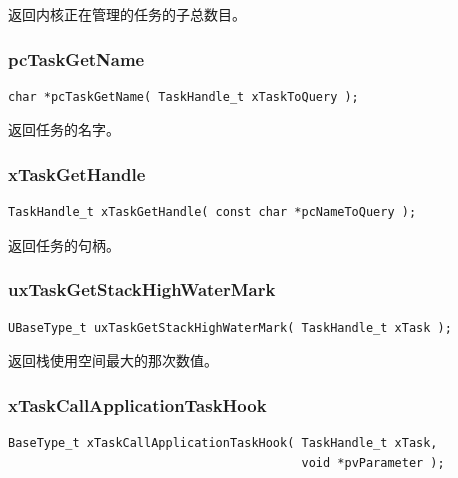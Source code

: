 \documentclass[12pt, a4paper]{article}
\begin{document}
返回内核正在管理的任务的子总数目。

\subsubsection {pcTaskGetName}

\begin{lstlisting}[language={[ANSI]C},keywordstyle=\color{blue!70},commentstyle=\color{red!50!green!50!blue!50},frame=shadowbox, rulesepcolor=\color{red!20!green!20!blue!20}]
char *pcTaskGetName( TaskHandle_t xTaskToQuery );
\end{lstlisting}

返回任务的名字。

\subsubsection {xTaskGetHandle}

\begin{lstlisting}[language={[ANSI]C},keywordstyle=\color{blue!70},commentstyle=\color{red!50!green!50!blue!50},frame=shadowbox, rulesepcolor=\color{red!20!green!20!blue!20}]
TaskHandle_t xTaskGetHandle( const char *pcNameToQuery );
\end{lstlisting}

返回任务的句柄。

\subsubsection {uxTaskGetStackHighWaterMark}

\begin{lstlisting}[language={[ANSI]C},keywordstyle=\color{blue!70},commentstyle=\color{red!50!green!50!blue!50},frame=shadowbox, rulesepcolor=\color{red!20!green!20!blue!20}]
UBaseType_t uxTaskGetStackHighWaterMark( TaskHandle_t xTask );
\end{lstlisting}

返回栈使用空间最大的那次数值。

\subsubsection {xTaskCallApplicationTaskHook}

\begin{lstlisting}[language={[ANSI]C},keywordstyle=\color{blue!70},commentstyle=\color{red!50!green!50!blue!50},frame=shadowbox, rulesepcolor=\color{red!20!green!20!blue!20}]
BaseType_t xTaskCallApplicationTaskHook( TaskHandle_t xTask, 
                                         void *pvParameter );
\end{lstlisting}
\end{document}
